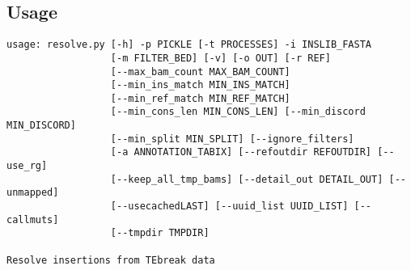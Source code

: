 \documentclass[letterpaper,11pt]{article}
\begin{document}
\subsection{Usage}
\begin{verbatim}
usage: resolve.py [-h] -p PICKLE [-t PROCESSES] -i INSLIB_FASTA
                  [-m FILTER_BED] [-v] [-o OUT] [-r REF]
                  [--max_bam_count MAX_BAM_COUNT]
                  [--min_ins_match MIN_INS_MATCH]
                  [--min_ref_match MIN_REF_MATCH]
                  [--min_cons_len MIN_CONS_LEN] [--min_discord MIN_DISCORD]
                  [--min_split MIN_SPLIT] [--ignore_filters]
                  [-a ANNOTATION_TABIX] [--refoutdir REFOUTDIR] [--use_rg]
                  [--keep_all_tmp_bams] [--detail_out DETAIL_OUT] [--unmapped]
                  [--usecachedLAST] [--uuid_list UUID_LIST] [--callmuts]
                  [--tmpdir TMPDIR]

Resolve insertions from TEbreak data


\end{verbatim}
\end{document}
